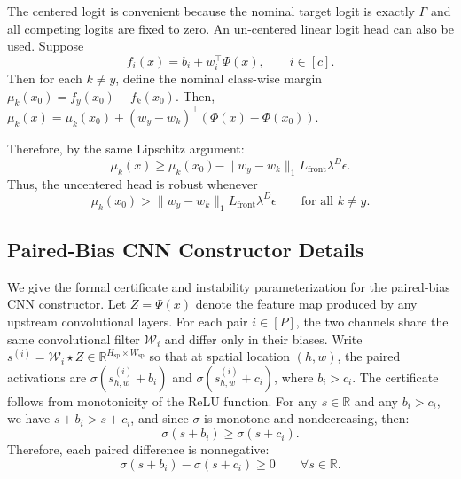 \documentclass{article}
\theoremstyle{definition}
\begin{document}
The centered logit is convenient because the nominal target logit is exactly $\Gamma$ and all competing logits are fixed to zero. An un-centered linear logit head can also be used. Suppose
\begin{equation}
    f_i(x)=b_i+w_i^\top\Phi(x),
    \qquad i\in[c].
\end{equation}
Then for each $k\neq y$, define the nominal class-wise margin $\mu_k(x_0)=f_y(x_0)-f_k(x_0)$. Then, $\mu_k(x)=\mu_k(x_0)+(w_y-w_k)^\top(\Phi(x)-\Phi(x_0))$.

Therefore, by the same Lipschitz argument:
\begin{equation}
    \mu_k(x)
    \geq
    \mu_k(x_0)
    -
    \|w_y-w_k\|_1L_{\mathrm{front}}\lambda^D\epsilon.
\end{equation}
Thus, the uncentered head is robust whenever
\begin{equation}
    \mu_k(x_0)
    >
    \|w_y-w_k\|_1L_{\mathrm{front}}\lambda^D\epsilon
    \qquad
    \text{for all } k\neq y.
    \label{eq:app_contract_uncentered}
\end{equation}

\subsection{Paired-Bias CNN Constructor Details}
\label{app:paired_bias_cnn}

We give the formal certificate and instability parameterization for the paired-bias CNN constructor. Let $Z=\Psi(x)$ denote the feature map produced by any upstream convolutional layers. For each pair $i\in[P]$, the two channels share the same convolutional filter $\mathcal W_i$ and differ only in their biases. Write $ s^{(i)}=\mathcal W_i\star Z\in\mathbb R^{H_{\mathrm{sp}}\times W_{\mathrm{sp}}}$ so that at spatial location $(h,w)$, the paired activations are $\sigma(s_{h,w}^{(i)}+b_i)$ and $\sigma(s_{h,w}^{(i)}+c_i)$, where $b_i>c_i$. The certificate follows from monotonicity of the ReLU function. For any $s\in\mathbb R$ and any $b_i>c_i$, we have $s+b_i>s+c_i$, and since $\sigma$ is monotone and nondecreasing, then:
\begin{equation}
    \sigma(s+b_i)\geq \sigma(s+c_i).
    \label{eq:app_paired_bias_monotone}
\end{equation}
Therefore, each paired difference is nonnegative:
\begin{equation}
    \sigma(s+b_i)-\sigma(s+c_i)\geq 0
    \qquad
    \forall s\in\mathbb R.
    \label{eq:app_paired_bias_nonnegative}
\end{equation}
\end{document}

